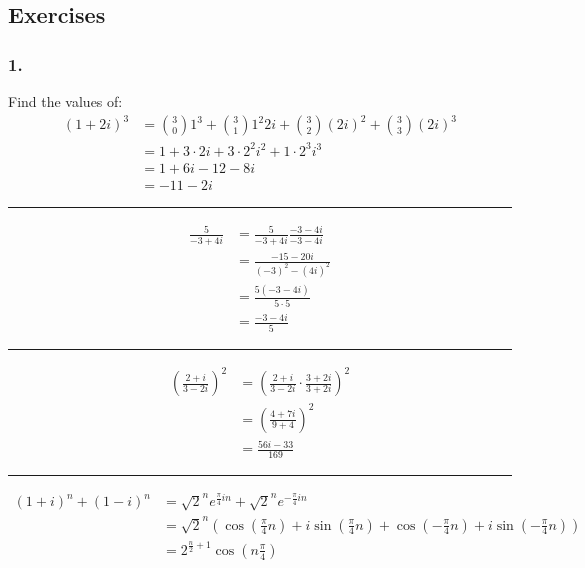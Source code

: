 \subsection{Exercises}
\subsubsection{1.}
Find the values of:
\begin{align*}
(1 + 2i)^{3} &= \binom{3}{0}1^3 + \binom{3}{1}1^2 2i + \binom{3}{2}(2i)^2 + \binom{3}{3} (2i)^3 \\
& = 1 + 3 \cdot 2i + 3 \cdot 2^2 i^2 + 1 \cdot 2^3 i^3 \\
& = 1 + 6i - 12 - 8i \\
& = -11 - 2i 
\end{align*}
\rule{\textwidth}{1pt}
\begin{align*}
\frac{5}{-3 + 4i} &= \frac{5}{-3 + 4i} \frac{-3-4i}{-3-4i} \\
 &= \frac{-15 - 20i}{(-3)^{2} -(4i)^{2}} \\
 &= \frac{5 (-3 - 4i)}{5 \cdot 5} \\
 &= \frac{-3-4i}{5} 
\end{align*}
\rule{\textwidth}{1pt}
\begin{align*}
(\frac{2+i}{3-2i})^{2} &= (\frac{2+i}{3-2i} \cdot \frac{3 + 2i}{3 +2i})^{2} \\
 &= (\frac{4 + 7i}{9 + 4 })^2 \\
 &= \frac{56i - 33}{169} 
\end{align*}
\rule{\textwidth}{1pt}
\begin{align*}
(1+i)^n + (1-i)^n &= \sqrt{2}^n e^{\frac{\pi}{4}in} + \sqrt{2}^n e^{-\frac{\pi}{4}in} \\
 & = \sqrt{2}^n(\cos(\frac{\pi}{4}n) + i \sin(\frac{\pi}{4}n) + \cos(-\frac{\pi}{4}n) + i \sin(-\frac{\pi}{4}n)) \\
 & = 2^{\frac{n}{2} + 1} \cos(n \frac{\pi}{4})
\end{align*}
